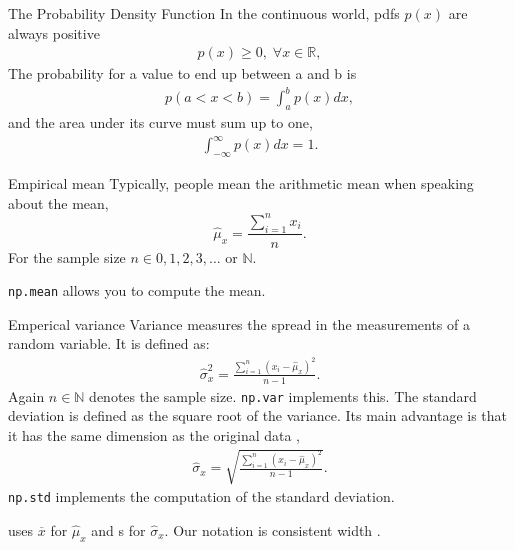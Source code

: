 \documentclass[notes]{beamer}
\begin{document}
    \begin{frame}{The Probability Density Function}
      In the continuous world, pdfs $p(x)$ are always positive
      \begin{align}
        p(x) \geq 0, \; \forall x \in \mathbb{R},
      \end{align}
      The probability for a value to end up between a and b is
      \begin{align}
        p(a < x < b) = \int_{a}^{b} p(x) dx,
      \end{align}
      and the area under its curve must sum up to one,
      \begin{align}
        \int_{-\infty}^{\infty} p(x) dx = 1.
      \end{align}

    \end{frame}


    \begin{frame}{Empirical mean}
      Typically, people mean the arithmetic mean when speaking about the mean,
      \begin{equation}
        \hat{\mu}_x = \frac{\sum_{i=1}^{n} x_i}{n} .
      \end{equation}
      For the sample size $n \in {0,1,2,3,\dots}$ or $\mathbb{N}$.

      \texttt{np.mean} allows you to compute the mean.
    \end{frame}


    \begin{frame}{Emperical variance}
      Variance measures the spread in the measurements of a random variable.
      It is defined as:
      \begin{align}
        \hat{\sigma}_x^2 = \frac{\sum_{i=1}^{n}(x_i - \hat{\mu}_x)^2}{n-1}.
      \end{align}
      Again $n \in \mathbb{N}$ denotes the sample size.
      \texttt{np.var} implements this.
      The standard deviation is defined as the square root of the variance.
      Its main advantage is that it has the same dimension as the original data \cite{haslwanter2016introduction},
      \begin{align}
        \hat{\sigma}_x = \sqrt{\frac{\sum_{i=1}^{n}(x_i - \hat{\mu}_x)^2}{n-1}}.
      \end{align}
      \texttt{np.std} implements the computation of the standard deviation.
      
      \cite{haslwanter2016introduction} uses $\overline{x}$ for $\hat{\mu}_x$ and 
      s for $\hat{\sigma}_x$. Our notation is consistent width \cite{mcnicholas2016mixture}.
    \end{frame}
\end{document}
